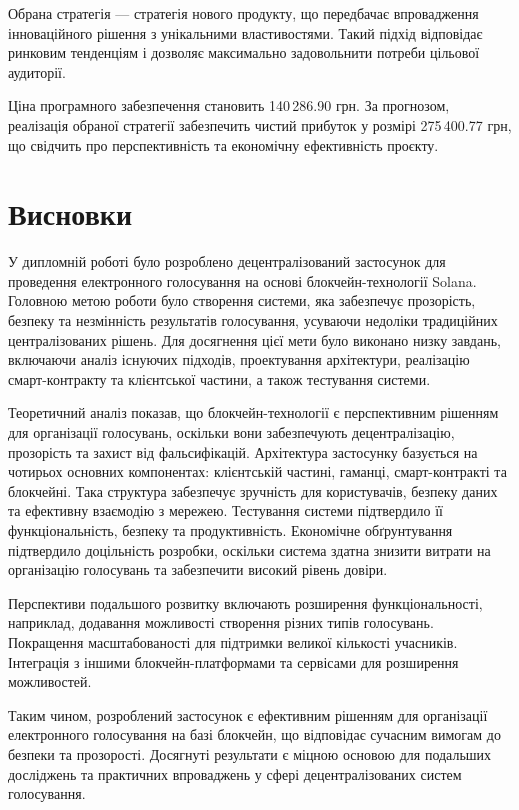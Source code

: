 \documentclass[14pt]{extreport}
\newcommand{\tocchap}[1]{
  \chapter*{#1}
  \addcontentsline{toc}{chapter}{\MakeUppercase{#1}}
}
\begin{document}
  Обрана стратегія — стратегія нового продукту, що передбачає впровадження інноваційного рішення з унікальними властивостями. Такий підхід відповідає ринковим тенденціям і дозволяє максимально задовольнити потреби цільової аудиторії.

  Ціна програмного забезпечення становить 140\,286.90 грн. За прогнозом, реалізація обраної стратегії забезпечить чистий прибуток у розмірі 275\,400.77 грн, що свідчить про перспективність та економічну ефективність проєкту.
  
  \tocchap{Висновки}
  
  У дипломній роботі було розроблено децентралізований застосунок для проведення електронного голосування на основі блокчейн-технології Solana. Головною метою роботи було створення системи, яка забезпечує прозорість, безпеку та незмінність результатів голосування, усуваючи недоліки традиційних централізованих рішень. Для досягнення цієї мети було виконано низку завдань, включаючи аналіз існуючих підходів, проектування архітектури, реалізацію смарт-контракту та клієнтської частини, а також тестування системи.
  
  Теоретичний аналіз показав, що блокчейн-технології є перспективним рішенням для організації голосувань, оскільки вони забезпечують децентралізацію, прозорість та захист від фальсифікацій. Архітектура застосунку базується на чотирьох основних компонентах: клієнтській частині, гаманці, смарт-контракті та блокчейні. Така структура забезпечує зручність для користувачів, безпеку даних та ефективну взаємодію з мережею. Тестування системи підтвердило її функціональність, безпеку та продуктивність. Економічне обґрунтування підтвердило доцільність розробки, оскільки система здатна знизити витрати на організацію голосувань та забезпечити високий рівень довіри.
  
  Перспективи подальшого розвитку включають розширення функціональності, наприклад, додавання можливості створення різних типів  голосувань. Покращення масштабованості для підтримки великої кількості учасників. Інтеграція з іншими блокчейн-платформами та сервісами для розширення можливостей.
  
  Таким чином, розроблений застосунок є ефективним рішенням для організації електронного голосування на базі блокчейн, що відповідає сучасним вимогам до безпеки та прозорості. Досягнуті результати є міцною основою для подальших досліджень та практичних впроваджень у сфері децентралізованих систем голосування.
  
\end{document}
